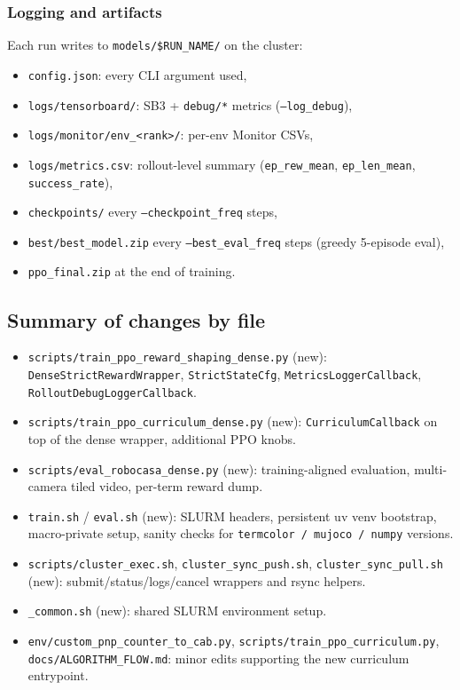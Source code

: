 \documentclass[11pt]{article}
\begin{document}
\subsubsection*{Logging and artifacts}
Each run writes to \texttt{models/\$RUN\_NAME/} on the cluster:
\begin{itemize}
  \item \texttt{config.json}: every CLI argument used,
  \item \texttt{logs/tensorboard/}: SB3 + \texttt{debug/*} metrics
    (\texttt{--log\_debug}),
  \item \texttt{logs/monitor/env\_<rank>/}: per-env Monitor CSVs,
  \item \texttt{logs/metrics.csv}: rollout-level summary
    (\texttt{ep\_rew\_mean}, \texttt{ep\_len\_mean},
    \texttt{success\_rate}),
  \item \texttt{checkpoints/} every \texttt{--checkpoint\_freq} steps,
  \item \texttt{best/best\_model.zip} every \texttt{--best\_eval\_freq} steps
    (greedy 5-episode eval),
  \item \texttt{ppo\_final.zip} at the end of training.
\end{itemize}

\subsection{Summary of changes by file}
\begin{itemize}
  \item \texttt{scripts/train\_ppo\_reward\_shaping\_dense.py} (new):
    \texttt{DenseStrictRewardWrapper}, \texttt{StrictStateCfg},
    \texttt{MetricsLoggerCallback}, \texttt{RolloutDebugLoggerCallback}.
  \item \texttt{scripts/train\_ppo\_curriculum\_dense.py} (new):
    \texttt{CurriculumCallback} on top of the dense wrapper, additional PPO
    knobs.
  \item \texttt{scripts/eval\_robocasa\_dense.py} (new): training-aligned
    evaluation, multi-camera tiled video, per-term reward dump.
  \item \texttt{train.sh} / \texttt{eval.sh} (new): SLURM headers, persistent
    uv venv bootstrap, macro-private setup, sanity checks for
    \texttt{termcolor / mujoco / numpy} versions.
  \item \texttt{scripts/cluster\_exec.sh}, \texttt{cluster\_sync\_push.sh},
    \texttt{cluster\_sync\_pull.sh} (new): submit/status/logs/cancel
    wrappers and rsync helpers.
  \item \texttt{\_common.sh} (new): shared SLURM environment setup.
  \item \texttt{env/custom\_pnp\_counter\_to\_cab.py},
    \texttt{scripts/train\_ppo\_curriculum.py},
    \texttt{docs/ALGORITHM\_FLOW.md}: minor edits supporting the new
    curriculum entrypoint.
\end{itemize}
\end{document}
